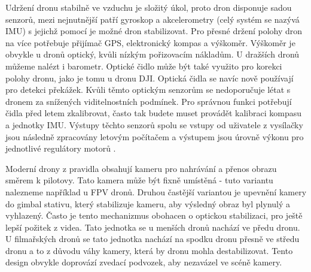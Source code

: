 Udržení dronu stabilně ve vzduchu je složitý úkol, proto dron disponuje sadou senzorů, mezi nejnutnější patří gyroskop a akcelerometry (celý systém se nazývá IMU) s jejichž pomocí je možné dron stabilizovat. Pro přesné držení polohy dron na více potřebuje přijímač GPS, elektronický kompas a výškoměr. Výškoměr je obvykle u dronů optický, kvůli nízkým pořizovacím nákladům. U dražších dronů můžeme nalézt i barometr. Optické čidlo může být také využito pro korekci polohy dronu, jako je tomu u dronu DJI. Optická čidla se navíc nově používají pro detekci překážek. Kvůli těmto optickým senzorům se nedoporučuje létat s dronem za snížených viditelnostních podmínek. Pro správnou funkci potřebují čidla před letem zkalibrovat, často tak budete muset provádět kalibraci kompasu a jednotky IMU. Výstupy těchto senzorů spolu se vstupy od uživatele z vysílačky jsou následně zpracovány letovým počítačem a výstupem jsou úrovně výkonu pro jednotlivé regulátory motorů \cite{droneSenzors}.

Moderní drony z pravidla obsahují kameru pro nahrávání a přenos obrazu směrem k pilotovy. Tato kamera může být fixně umístěná - tuto variantu nalezneme například u FPV dronů. Druhou častější variantou je upevnění kamery do gimbal stativu, který stabilizuje kameru, aby výsledný obraz byl plynulý a vyhlazený. Často je tento mechanizmus obohacen o optickou stabilizaci, pro ještě lepší požitek z videa. Tato jednotka se u menších dronů nachází ve předu dronu. U filmařských dronů se tato jednotka nachází na spodku dronu přesně ve středu dronu a to z důvodu váhy kamery, která by dronu mohla destabilizovat. Tento design obvykle doprovází zvedací podvozek, aby nezavázel ve scéně kamery.


